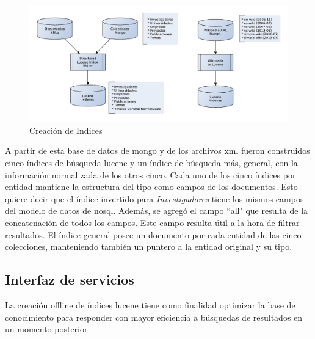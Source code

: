 \begin{figure}[H]
  \centering
    \includegraphics[scale=0.86]{graficos/LuceneWritersJuntos}
  \caption{Creación de Indices}
  \label{fig:LuceneIndexWriterBoth}
\end{figure}

A partir de esta base de datos de mongo y de los archivos xml fueron construidos cinco índices
de búsqueda lucene y un índice de búsqueda más, general, con la
información normalizada de los otros cinco. 
Cada uno de los cinco índices por entidad mantiene la estructura del tipo como campos de los documentos.
Esto quiere decir que el índice invertido para \emph{Investigadores} tiene los mismos campos
del modelo de datos de nosql. Además, se agregó el campo ``all" que resulta de la concatenación de
todos los campos. Este campo resulta útil a la hora de filtrar resultados. 
El índice general posee un documento por cada entidad de las cinco colecciones, 
manteniendo también un puntero a la entidad original y su tipo.




\subsection{Interfaz de servicios}
\label{subsec:modelos-db}
La creación offline de índices lucene tiene como finalidad optimizar
la base de conocimiento para responder con mayor eficiencia 
a búsquedas de resultados en un momento posterior. 


